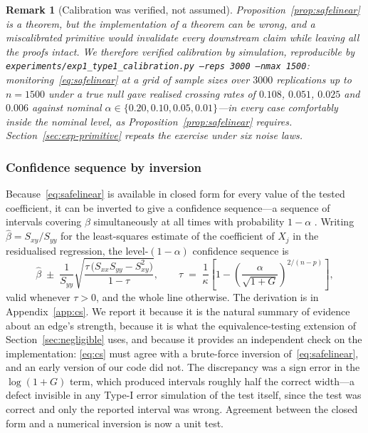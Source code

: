 \documentclass[pdflatex,sn-apa]{sn-jnl}
\theoremstyle{thmstyleone}%
\theoremstyle{thmstyletwo}%
\newtheorem{remark}{Remark}%
\theoremstyle{thmstylethree}%
\begin{document}
\begin{remark}[Calibration was verified, not assumed]\label{rem:calibration}
Proposition~\ref{prop:safelinear} is a theorem, but the implementation of a
theorem can be wrong, and a miscalibrated primitive would invalidate every
downstream claim while leaving all the proofs intact. We therefore verified
calibration by simulation, reproducible by
\texttt{experiments/exp1\_type1\_calibration.py --reps 3000 --nmax 1500}:
monitoring~\eqref{eq:safelinear} at a grid of sample sizes over $3000$
replications up to $n = 1500$ under a true null gave realised crossing rates
of $0.108$, $0.051$, $0.025$ and $0.006$ against nominal
$\alpha \in \{0.20, 0.10, 0.05, 0.01\}$---in every case comfortably inside the
nominal level, as Proposition~\ref{prop:safelinear} requires.
Section~\ref{sec:exp-primitive} repeats the exercise under six noise laws.
\end{remark}

\subsubsection{Confidence sequence by inversion}\label{sec:cs}

Because~\eqref{eq:safelinear} is available in closed form for every value of
the tested coefficient, it can be inverted to give a confidence sequence---a
sequence of intervals covering $\beta$ simultaneously at all times with
probability $1-\alpha$ \citep{howard2021timeuniform}. Writing $\hat\beta = S_{xy}/S_{yy}$ for the
least-squares estimate of the coefficient of $X_j$ in the residualised
regression, the level-$(1-\alpha)$ confidence sequence is
\begin{equation}\label{eq:cs}
\hat\beta \;\pm\; \frac{1}{S_{yy}}
  \sqrt{\frac{\tau\,\bigl(S_{xx} S_{yy} - S_{xy}^2\bigr)}{1-\tau}},
\qquad
\tau \;=\; \frac{1}{\kappa}
  \left[ 1 - \left(\frac{\alpha}{\sqrt{1+G}}\right)^{2/(n-p)} \right] ,
\end{equation}
valid whenever $\tau > 0$, and the whole line otherwise. The derivation is in
Appendix~\ref{app:cs}. We report it because it is the natural summary of
evidence about an edge's strength, because it is what the equivalence-testing
extension of Section~\ref{sec:negligible} uses, and because it provides an
independent check on the implementation: \eqref{eq:cs} must agree with a
brute-force inversion of~\eqref{eq:safelinear}, and an early version of our
code did not. The discrepancy was a sign error in the $\log(1+G)$ term, which
produced intervals roughly half the correct width---a defect invisible in any
Type-I error simulation of the test itself, since the test was correct and
only the reported interval was wrong. Agreement between the closed form and a
numerical inversion is now a unit test.
\end{document}
